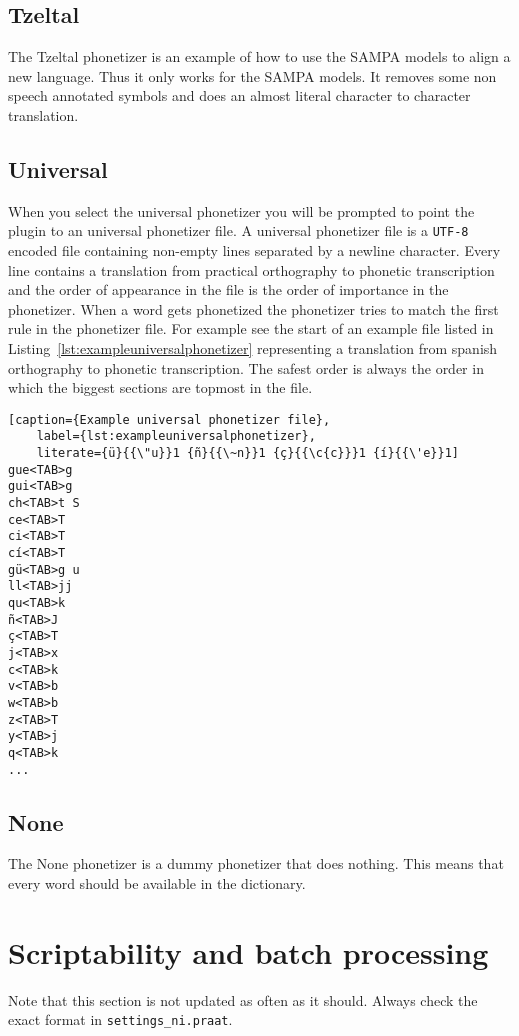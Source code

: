 \subsection{Tzeltal}
The Tzeltal phonetizer is an example of how to use the SAMPA models to align a
new language. Thus it only works for the SAMPA models. It removes some non
speech annotated symbols and does an almost literal character to character
translation.

\subsection{Universal}\label{sec:univphonetizer}
When you select the universal phonetizer you will be prompted to point the
plugin to an universal phonetizer file.
A universal phonetizer file is a \texttt{UTF-8} encoded file containing
non-empty lines separated by a newline character. Every line contains a
translation from practical orthography to phonetic transcription and the order
of appearance in the file is the order of importance in the phonetizer. When a
word gets phonetized the phonetizer tries to match the first rule in the
phonetizer file. For example see the start of an example file listed in
Listing~\ref{lst:exampleuniversalphonetizer} representing a translation from
spanish orthography to phonetic transcription. The safest order is always the
order in which the biggest sections are topmost in the file.

\begin{lstlisting}[caption={Example universal phonetizer file},
	label={lst:exampleuniversalphonetizer},
	literate={ü}{{\"u}}1 {ñ}{{\~n}}1 {ç}{{\c{c}}}1 {í}{{\'e}}1]
gue<TAB>g
gui<TAB>g
ch<TAB>t S
ce<TAB>T
ci<TAB>T
cí<TAB>T
gü<TAB>g u
ll<TAB>jj
qu<TAB>k
ñ<TAB>J
ç<TAB>T
j<TAB>x
c<TAB>k
v<TAB>b
w<TAB>b
z<TAB>T
y<TAB>j
q<TAB>k
...
\end{lstlisting}

\subsection{None}
The None phonetizer is a dummy phonetizer that does nothing. This means that
every word should be available in the dictionary.

\section{Scriptability and batch processing}
Note that this section is not updated as often as it should. Always check the
exact format in \texttt{settings\_ni.praat}.

